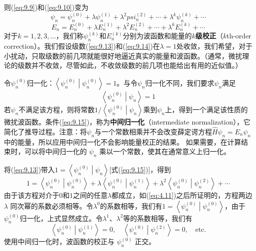     则(\ref{eq:9.9})和(\ref{eq:9.10})变为
    \begin{equation}
        \psi_n = \psi_n^{\left(0\right)} + \lambda \psi_n^{\left(1\right)} + \lambda^2 psi_n^{\left(2\right)} + \cdots + \lambda^k \psi_n^{\left(k\right)} + \cdots
        \label{eq:9.13}
    \end{equation}
    \begin{equation}
        E_n = E_n^{\left(0\right)} + \lambda E_n^{\left(1\right)} + \lambda^2 E_n^{\left(2\right)} + \cdots + \lambda^k E_n^{\left(k\right)} + \cdots
        \label{eq:9.14}
    \end{equation}
    对于$k = 1,2,3,\ldots$，我们称$\psi_n^{\left(k\right)}$和$E_n^{\left(k\right)}$分别为波函数和能量的\textbf{$k$级校正}（$k$th-order correction）。我们假设级数(\ref{eq:9.13})和(\ref{eq:9.14})在$\lambda=1$处收敛，我们希望，对于小扰动，只取级数的前几项就能很好地逼近真实的能量和波函数。（通常，微扰理论的级数并不收敛，尽管如此，不收敛级数的前几项也能给出有用的近似值。）

    令$\psi_n^{\left(0\right)}$归一化：$\left\langle \psi_n^{\left(0\right)} \middle| \psi_n^{\left(0\right)} \right\rangle = 1$。与令$\psi_n$归一化不同，我们要求$\psi_n$满足
    \begin{equation}
        \left\langle \psi_n^{\left(0\right)} \middle| \psi_n \right\rangle = 1
        \label{eq:9.15}
    \end{equation}
    若$\psi_n$不满足该方程，则将常数$1/\left\langle \psi_n^{\left(0\right)} \middle| \psi_n \right\rangle$乘到$\psi_n$上，得到一个满足该性质的微扰波函数。条件(\ref{eq:9.15})，称为\textbf{中间归一化}（intermediate normalization），它简化了推导过程。注意：将$\psi_n$与一个常数相乘并不会改变薛定谔方程$\hat{H} \psi_n = E_n \psi_n$中的能量，所以应用中间归一化不会影响能量校正的结果。 如果需要，在计算结束时，可以将中间归一化的 $\psi_n$ 乘以一个常数，使其在通常意义上归一化。

    将(\ref{eq:9.13})带入$1 = \left\langle \psi_n^{\left(0\right)} \middle| \psi_n \right\rangle$[式(\ref{eq:9.15})]，得到
    \begin{equation*}
        1 = \left\langle \psi_n^{\left(0\right)} \middle| \psi_n^{\left(0\right)} \right\rangle + \lambda \left\langle \psi_n^{\left(0\right)} \middle| \psi_n^{\left(1\right)} \right\rangle + \lambda^2 \left\langle \psi_n^{\left(0\right)} \middle| \psi_n^{\left(2\right)} \right\rangle + \cdots
    \end{equation*}
    由于该方程对介于$0$和$1$之间的任意$\lambda$都成立，如(\ref{eq:4.11})之后所证明的，方程两边 $\lambda$ 同次幂的系数必须相等。令$\lambda^0$的系数相等，我们有$1 = \left\langle \psi_n^{\left(0\right)} \middle| \psi_n^{\left(0\right)} \right\rangle$，由于$\psi_n^{\left(0\right)}$归一化，上式显然成立。令$\lambda^1$、$\lambda^2$等的系数相等，我们有
    \begin{equation}
        \left\langle \psi_n^{\left(0\right)} \middle| \psi_n^{\left(1\right)} \right\rangle = 0, \quad \left\langle \psi_n^{\left(0\right)} \middle| \psi_n^{\left(2\right)} \right\rangle = 0, \quad \text{etc.}
        \label{eq:9.16}
    \end{equation}
    使用中间归一化时，波函数的校正与 $\psi_n^{\left(0\right)}$ 正交。

